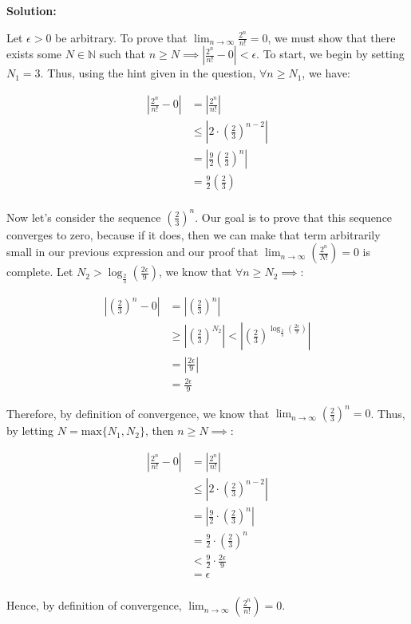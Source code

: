 \documentclass[10pt]{article}
\newenvironment{solution}{
	\vspace{0.4cm}\par\noindent\large\textbf{{Solution:}}\par\vspace{1em}
}{\vspace{0.8em}}
\begin{document}
\begin{solution}

	Let $\epsilon > 0$ be arbitrary. To prove that $\lim_{n\to\infty}\frac{2^n}{n!} = 0$, we must show that there exists some $N \in \mathbb{N}$ such that $n \ge N \implies |\frac{2^n}{n!} - 0| < \epsilon$. To start, we begin by setting $N_1 = 3$. Thus, using the hint given in the question, $\forall n \ge N_1$, we have:


	\begin{align*}
		|\frac{2^n}{n!} - 0| &= |\frac{2^n}{n!}| \\
		&\le |2 \cdot (\frac{2}{3})^{n - 2} | \\
		&= |\frac{9}{2}(\frac{2}{3})^n| \\
		&= \frac{9}{2}(\frac{2}{3}) \\
	\end{align*}

	Now let's consider the sequence $(\frac{2}{3})^n$. Our goal is to prove that this sequence converges to zero, because if it does, then we can make that term arbitrarily small in our previous expression and our proof that $\lim_{n\to\infty}(\frac{2^n}{N!}) = 0$ is complete. Let $N_2 > \log_{\frac{2}{3}}(\frac{2\epsilon}{9})$, we know that $\forall n \ge N_2 \implies$:

	\begin{align*}
		|(\frac{2}{3})^n - 0| &= |(\frac{2}{3})^n| \\
		&\ge |(\frac{2}{3})^{N_2}|
		< |(\frac{2}{3})^{\log_{\frac{2}{3}}(\frac{2\epsilon}{9})}| \\
		&= |\frac{2\epsilon}{9}| \\
		&= \frac{2\epsilon}{9}
	\end{align*}

	Therefore, by definition of convergence, we know that $\lim_{n\to\infty}(\frac{2}{3})^n = 0$. Thus, by letting $N = \text{max}\{N_1, N_2\}$, then $n \ge N \implies$:

	\begin{align*}
		|\frac{2^n}{n!} - 0| &= |\frac{2^n}{n!}| \\
		&\le |2 \cdot (\frac{2}{3})^{n - 2}| \\
		&= |\frac{9}{2} \cdot (\frac{2}{3})^n| \\
		&= \frac{9}{2} \cdot (\frac{2}{3})^n \\
		&< \frac{9}{2} \cdot \frac{2\epsilon}{9} \\
		&= \epsilon \\
	\end{align*}

	Hence, by definition of convergence, $\lim_{n\to\infty} (\frac{2^n}{n!}) = 0$.
\end{solution}
\end{document}
